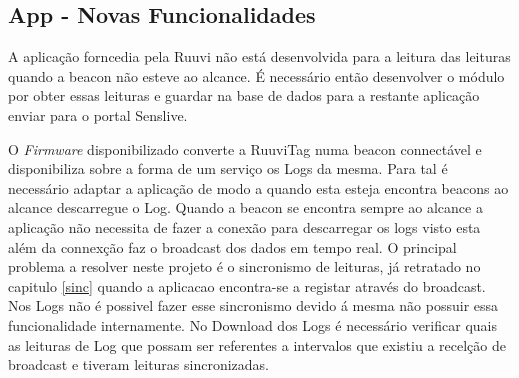 \subsection{App - Novas Funcionalidades}

\par A aplicação forncedia pela Ruuvi não está desenvolvida para a leitura das leituras quando a beacon não esteve ao alcance. É necessário então desenvolver o módulo por obter essas leituras e guardar na base de dados para a restante aplicação enviar para o portal Senslive.
\par O \textit{Firmware} disponibilizado converte a RuuviTag numa beacon connectável e disponibiliza sobre a forma de um serviço os Logs da mesma\cite{ruuvitlog}. Para tal é necessário adaptar a aplicação de modo a quando esta esteja encontra beacons ao alcance descarregue o Log.  Quando a beacon se encontra sempre ao alcance a aplicação não necessita de fazer a conexão para descarregar os logs visto esta além da connexção faz o broadcast dos dados em tempo real. O principal problema a resolver neste projeto é o sincronismo de leituras, já retratado no capitulo \ref{sinc} quando a aplicacao encontra-se a registar através do broadcast. Nos Logs não é possivel fazer esse sincronismo devido á mesma não possuir essa funcionalidade internamente. No Download dos Logs é necessário verificar quais as leituras de Log que possam ser referentes a intervalos que existiu a recelção de broadcast e tiveram leituras sincronizadas.



